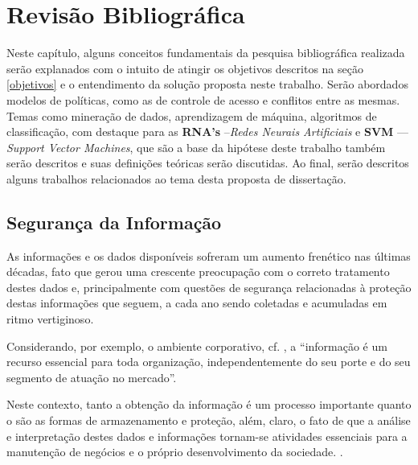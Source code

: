 \chapter{Revisão Bibliográfica}\label{referencial_teorico}
Neste capítulo, alguns conceitos fundamentais da pesquisa bibliográfica realizada serão explanados com o intuito de atingir os objetivos descritos na seção \ref{objetivos} e o entendimento da solução proposta neste trabalho. Serão abordados modelos de políticas, como as de controle de acesso e conflitos entre as mesmas. Temas como mineração de dados, aprendizagem de máquina, algoritmos de classificação, com destaque para as \textbf{RNA's} --\textit{Redes Neurais Artificiais} e \textbf{SVM} --- \textit{Support Vector Machines}, que são a base da hipótese deste trabalho também serão descritos e suas definições teóricas serão discutidas. Ao final, serão descritos alguns trabalhos relacionados ao tema desta proposta de dissertação.

\section{Segurança da Informação} \label{seguranca_informacao}
As informações e os dados disponíveis sofreram um aumento frenético nas últimas décadas, fato que gerou uma crescente preocupação com o correto tratamento destes dados e, principalmente com questões de segurança relacionadas à proteção destas informações que seguem, a cada ano sendo coletadas e acumuladas em ritmo vertiginoso. \cite{alecrim2019, machado2014, lima_fraud_2012, fayyad1996, santos_segurancnos_2007} 

Considerando, por exemplo, o ambiente corporativo, cf. , a ``informação é um recurso essencial para toda organização, independentemente do seu porte e do seu segmento de atuação no mercado''. 


Neste contexto, tanto a obtenção da informação é um processo importante quanto o são as formas de armazenamento e proteção, além, claro, o fato de que a análise e interpretação destes dados e informações tornam-se atividades essenciais para a manutenção de negócios e o próprio desenvolvimento da sociedade. \cite{Boscarioli2017} \cite{marciano_segurancda_nodate}.

